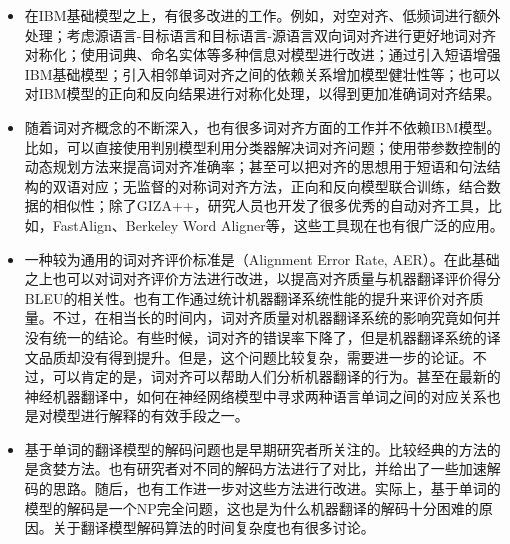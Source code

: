 \begin{itemize}
\vspace{0.5em}
\item 在IBM基础模型之上，有很多改进的工作。例如，对空对齐、低频词进行额外处理；考虑源语言-目标语言和目标语言-源语言双向词对齐进行更好地词对齐对称化；使用词典、命名实体等多种信息对模型进行改进；通过引入短语增强IBM基础模型；引入相邻单词对齐之间的依赖关系增加模型健壮性等；也可以对IBM模型的正向和反向结果进行对称化处理，以得到更加准确词对齐结果。

\item 随着词对齐概念的不断深入，也有很多词对齐方面的工作并不依赖IBM模型。比如，可以直接使用判别模型利用分类器解决词对齐问题；使用带参数控制的动态规划方法来提高词对齐准确率；甚至可以把对齐的思想用于短语和句法结构的双语对应；无监督的对称词对齐方法，正向和反向模型联合训练，结合数据的相似性；除了GIZA++，研究人员也开发了很多优秀的自动对齐工具，比如，FastAlign、Berkeley Word Aligner等，这些工具现在也有很广泛的应用。

\vspace{0.5em}
\item 一种较为通用的词对齐评价标准是{}（Alignment Error Rate, AER）。在此基础之上也可以对词对齐评价方法进行改进，以提高对齐质量与机器翻译评价得分BLEU的相关性。也有工作通过统计机器翻译系统性能的提升来评价对齐质量。不过，在相当长的时间内，词对齐质量对机器翻译系统的影响究竟如何并没有统一的结论。有些时候，词对齐的错误率下降了，但是机器翻译系统的译文品质却没有得到提升。但是，这个问题比较复杂，需要进一步的论证。不过，可以肯定的是，词对齐可以帮助人们分析机器翻译的行为。甚至在最新的神经机器翻译中，如何在神经网络模型中寻求两种语言单词之间的对应关系也是对模型进行解释的有效手段之一。

\vspace{0.5em}
\item 基于单词的翻译模型的解码问题也是早期研究者所关注的。比较经典的方法的是贪婪方法。也有研究者对不同的解码方法进行了对比，并给出了一些加速解码的思路。随后，也有工作进一步对这些方法进行改进。实际上，基于单词的模型的解码是一个NP完全问题，这也是为什么机器翻译的解码十分困难的原因。关于翻译模型解码算法的时间复杂度也有很多讨论。
\end{itemize}
